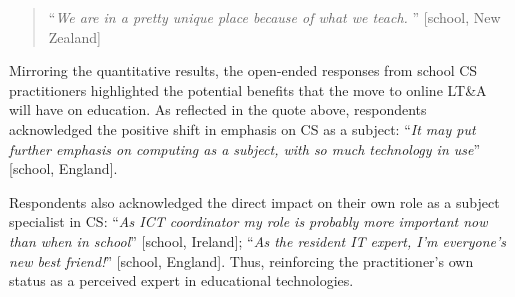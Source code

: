 \documentclass[conference]{IEEEtran}
\begin{document}
\begin{quotation}
``{\emph{We are in a pretty unique place because of what we
teach. }}'' [school, New Zealand]
\end{quotation}



Mirroring the quantitative results, the open-ended responses from
school CS practitioners highlighted the potential benefits that the move
to online LT\&A will have on education. As reflected in the quote
above, respondents acknowledged the positive shift in emphasis on
CS as a subject: ``{\emph{It may put further emphasis on
    computing as a subject, with so much technology in use}}''
[school, England].

Respondents also acknowledged the direct impact on their own role as a
subject specialist in CS: ``{\emph{As ICT coordinator my
role is probably more important now than when in school}}'' [school, Ireland];
``{\emph{As the resident IT expert, I’m everyone’s new best
friend!}}'' [school, England]. Thus, reinforcing the practitioner’s own status
as a perceived expert in educational technologies. 

\end{document}
